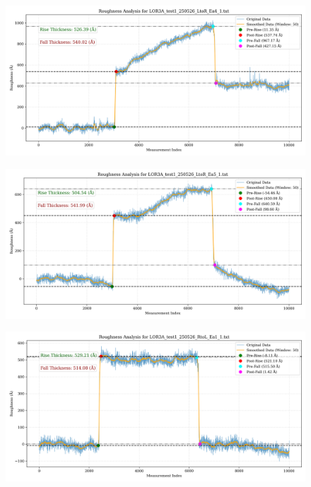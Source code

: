 \documentclass[platex,dvipdfmx,10pt,twoside,a4paper,jis2004]{jsarticle}
\begin{document}
\begin{figure}[H]
    \centering
    \includegraphics[width=\textwidth]{LOR3A_test1_250526_LtoR_Ea4_1.png}
    \label{fig:LOR3Atest1250526LtoREa41}
\end{figure}
\begin{figure}[H]
    \centering
    \includegraphics[width=\textwidth]{LOR3A_test1_250526_LtoR_Ea5_1.png}
    \label{fig:LOR3Atest1250526LtoREa51}
\end{figure}
\begin{figure}[H]
    \centering
    \includegraphics[width=\textwidth]{LOR3A_test1_250526_RtoL_Ea1_1.png}
    \label{fig:LOR3Atest1250526RtoLEa11}
\end{figure}
\end{document}
